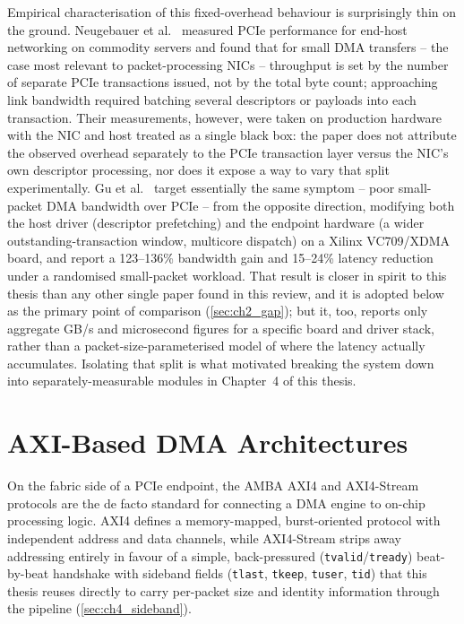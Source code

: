 Empirical characterisation of this fixed-overhead behaviour is surprisingly thin on the ground. Neugebauer et al.~\cite{neugebauer2018pcie} measured PCIe performance for end-host networking on commodity servers and found that for small DMA transfers -- the case most relevant to packet-processing NICs -- throughput is set by the number of separate PCIe transactions issued, not by the total byte count; approaching link bandwidth required batching several descriptors or payloads into each transaction. Their measurements, however, were taken on production hardware with the NIC and host treated as a single black box: the paper does not attribute the observed overhead separately to the PCIe transaction layer versus the NIC's own descriptor processing, nor does it expose a way to vary that split experimentally. Gu et al.~\cite{gu2025cooptimization} target essentially the same symptom -- poor small-packet DMA bandwidth over PCIe -- from the opposite direction, modifying both the host driver (descriptor prefetching) and the endpoint hardware (a wider outstanding-transaction window, multicore dispatch) on a Xilinx VC709/XDMA board, and report a 123--136\% bandwidth gain and 15--24\% latency reduction under a randomised small-packet workload. That result is closer in spirit to this thesis than any other single paper found in this review, and it is adopted below as the primary point of comparison (\autoref{sec:ch2_gap}); but it, too, reports only aggregate GB/s and microsecond figures for a specific board and driver stack, rather than a packet-size-parameterised model of where the latency actually accumulates. Isolating that split is what motivated breaking the system down into separately-measurable modules in Chapter~4 of this thesis.


\section{AXI-Based DMA Architectures}
\label{sec:ch2_axi_dma}

On the fabric side of a PCIe endpoint, the \ac{AMBA} \ac{AXI4} and \ac{AXI4-Stream} protocols \cite{arm2021axi, arm2010axistream} are the de facto standard for connecting a DMA engine to on-chip processing logic. AXI4 defines a memory-mapped, burst-oriented protocol with independent address and data channels, while AXI4-Stream strips away addressing entirely in favour of a simple, back-pressured (\texttt{tvalid}/\texttt{tready}) beat-by-beat handshake with sideband fields (\texttt{tlast}, \texttt{tkeep}, \texttt{tuser}, \texttt{tid}) that this thesis reuses directly to carry per-packet size and identity information through the pipeline (\autoref{sec:ch4_sideband}).

